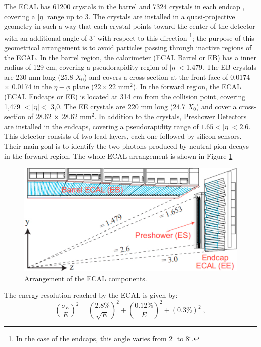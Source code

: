 \noindent The ECAL has 61200 crystals in the barrel and 7324 crystals in each endcap \cite{chp2:CMSTDR}, covering a 
$|\eta|$ range up to 3. The crystals are installed in a quasi-projective geometry 
in such a way that each crystal points toward the center of the detector with an additional angle 
of 3$^{\circ}$ with respect to this direction \footnote[1]{In the case of the endcaps, this angle 
varies from 2$^{\circ}$  to 8$^{\circ}$.}; the purpose of this 
geometrical arrangement is to avoid particles passing through inactive regions of the ECAL. In the 
barrel region, the calorimeter (ECAL Barrel or EB) has a inner radius of 129 cm, covering a 
pseudorapidity region of $|\eta| < $1.479. The EB crystals are 230 mm long (25.8 $X_{0}$) and 
covers a cross-section at the front face of 0.0174 $\times$ 0.0174 
in the $\eta-\phi$ plane ($22\times22$ mm$^{2}$). In the forward region,
the ECAL (ECAL Endcaps or EE) is located at 314 cm from the collision point, covering 
1,479 $ < |\eta| < $ 3,0. The EE crystals are 220 mm long (24.7 $X_{0}$) and cover
a cross-section of 28.62 $\times$ 28.62 mm$^{2}$. In addition to the crystals, Preshower 
Detectors are installed in the endcaps, covering a pseudorapidity range of  $1.65<|\eta|<2.6$. This detector consists of two 
lead layers, each one followed by silicon sensors. Their main goal is 
to identify the two photons produced by neutral-pion decays 
in the forward region. The whole ECAL arrangement is shown in Figure \ref{figchp2:ECALcrytal}

\begin{center}
\begin{figure}[h]
\centering
\includegraphics[scale=0.38]{figuras/Chapter2/ECAL.pdf}
\caption{Arrangement of the ECAL components.}\label{figchp2:ECALcrytal}
\end{figure}
\end{center}

\noindent The energy resolution reached by the ECAL is given by:
\begin{equation} \label{ECALenergyResolution}
 \left(\frac{\sigma_{E}}{E}\right)^{2} = \left(\frac{2.8\%}{\sqrt{E}}\right)^{2} + \left(\frac{0.12\%}{E}\right)^{2} + \left(0.3\% \right)^{2} \;, 
\end{equation}


